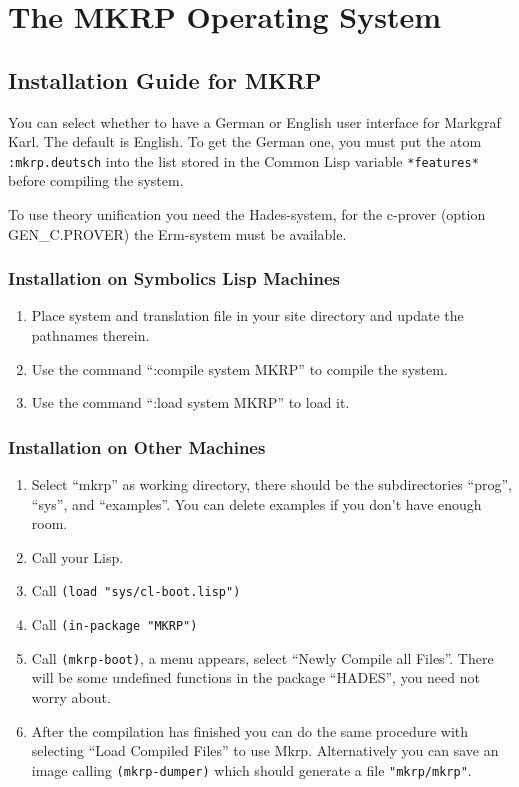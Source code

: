 \chapter{The MKRP Operating System}
\label{TheMKRPOperatingSystem}

\section{Installation Guide for MKRP}
\label{InstallationGuideforMKRP}

You can select whether to have a German or English user interface for 
{\sc Markgraf Karl}.
The default is English. To get the German one, you must put the
atom \verb!:mkrp.deutsch! into the list stored in 
the Common Lisp variable \verb!*features*! before compiling the system.

To use theory unification you need the {\sc Hades}-system, for the
c-prover (option GEN\_C.PROVER) the {\sc Erm}-system must be available.

\subsection{Installation on Symbolics Lisp Machines}
\label{InstallationonSymbolicsLispMachines} 
\begin{enumerate}
\item    Place system and translation file in your site directory and update the pathnames therein.
\item    Use the command ``:compile system MKRP'' to compile the system.
\item    Use the command ``:load system MKRP'' to load it.
\end{enumerate}

\subsection{Installation on Other Machines}
\label{InstallationonotherMachines}
\begin{enumerate}
\item  	Select ``mkrp'' as working directory, there should be the
	subdirectories ``prog'', ``sys'', and ``examples''. 
You can delete examples if you don't have enough room.
\item  	Call your Lisp.
\item  	Call {\tt (load "sys/cl-boot.lisp")}
\item  	Call {\tt (in-package "MKRP")}
\item  	Call {\tt (mkrp-boot)}, a menu appears, select 
``Newly Compile all Files''.
There will be some undefined functions in the package ``HADES'',
you need not worry about.
\item 	After the compilation has finished you can do the same procedure with
selecting ``Load Compiled Files'' to use {\sc Mkrp}.
Alternatively you can save an image calling {\tt (mkrp-dumper)} which 
should generate a file {\tt "mkrp/mkrp"}.
\end{enumerate}

